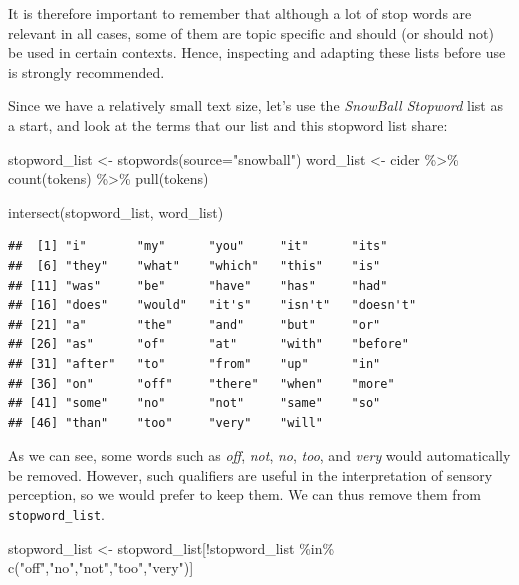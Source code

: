 \documentclass[
]{krantz}
\makeatletter
\newenvironment{Shaded}{\begin{snugshade}}{\end{snugshade}}
\newcommand{\AttributeTok}[1]{\textcolor[rgb]{0.61,0.61,0.61}{#1}}
\newcommand{\FunctionTok}[1]{\textcolor[rgb]{0,0,0}{#1}}
\newcommand{\NormalTok}[1]{#1}
\newcommand{\OtherTok}[1]{\textcolor[rgb]{0.37,0.37,0.37}{#1}}
\newcommand{\SpecialCharTok}[1]{\textcolor[rgb]{0,0,0}{#1}}
\newcommand{\StringTok}[1]{\textcolor[rgb]{0.5,0.5,0.5}{#1}}
\newenvironment{kframe}{%
\medskip{}
\setlength{\fboxsep}{.8em}
 \def\at@end@of@kframe{}%
 \ifinner\ifhmode%
  \def\at@end@of@kframe{\end{minipage}}%
  \begin{minipage}{\columnwidth}%
 \fi\fi%
 \def\FrameCommand##1{\hskip\@totalleftmargin \hskip-\fboxsep
 \colorbox{shadecolor}{##1}\hskip-\fboxsep
     \hskip-\linewidth \hskip-\@totalleftmargin \hskip\columnwidth}%
 \MakeFramed {\advance\hsize-\width
   \@totalleftmargin\z@ \linewidth\hsize
   \@setminipage}}%
 {\par\unskip\endMakeFramed%
 \at@end@of@kframe}
\renewenvironment{Shaded}{\begin{kframe}}{\end{kframe}}
\makeatother
\begin{document}
It is therefore important to remember that although a lot of stop words are relevant in all cases, some of them are topic specific and should (or should not) be used in certain contexts. Hence, inspecting and adapting these lists before use is strongly recommended.

Since we have a relatively small text size, let's use the \emph{SnowBall Stopword} list as a start, and look at the terms that our list and this stopword list share:

\begin{Shaded}
\begin{Highlighting}[]
\NormalTok{stopword\_list }\OtherTok{\textless{}{-}} \FunctionTok{stopwords}\NormalTok{(}\AttributeTok{source=}\StringTok{"snowball"}\NormalTok{)}
\NormalTok{word\_list }\OtherTok{\textless{}{-}}\NormalTok{ cider }\SpecialCharTok{\%\textgreater{}\%} 
  \FunctionTok{count}\NormalTok{(tokens) }\SpecialCharTok{\%\textgreater{}\%} 
  \FunctionTok{pull}\NormalTok{(tokens)}

\FunctionTok{intersect}\NormalTok{(stopword\_list, word\_list)}
\end{Highlighting}
\end{Shaded}

\begin{verbatim}
##  [1] "i"       "my"      "you"     "it"      "its"    
##  [6] "they"    "what"    "which"   "this"    "is"     
## [11] "was"     "be"      "have"    "has"     "had"    
## [16] "does"    "would"   "it's"    "isn't"   "doesn't"
## [21] "a"       "the"     "and"     "but"     "or"     
## [26] "as"      "of"      "at"      "with"    "before" 
## [31] "after"   "to"      "from"    "up"      "in"     
## [36] "on"      "off"     "there"   "when"    "more"   
## [41] "some"    "no"      "not"     "same"    "so"     
## [46] "than"    "too"     "very"    "will"
\end{verbatim}

As we can see, some words such as \emph{off}, \emph{not}, \emph{no}, \emph{too}, and \emph{very} would automatically be removed. However, such qualifiers are useful in the interpretation of sensory perception, so we would prefer to keep them. We can thus remove them from \texttt{stopword\_list}.

\begin{Shaded}
\begin{Highlighting}[]
\NormalTok{stopword\_list }\OtherTok{\textless{}{-}}\NormalTok{ stopword\_list[}\SpecialCharTok{!}\NormalTok{stopword\_list }\SpecialCharTok{\%in\%} \FunctionTok{c}\NormalTok{(}\StringTok{"off"}\NormalTok{,}\StringTok{"no"}\NormalTok{,}\StringTok{"not"}\NormalTok{,}\StringTok{"too"}\NormalTok{,}\StringTok{"very"}\NormalTok{)]}
\end{Highlighting}
\end{Shaded}
\end{document}
